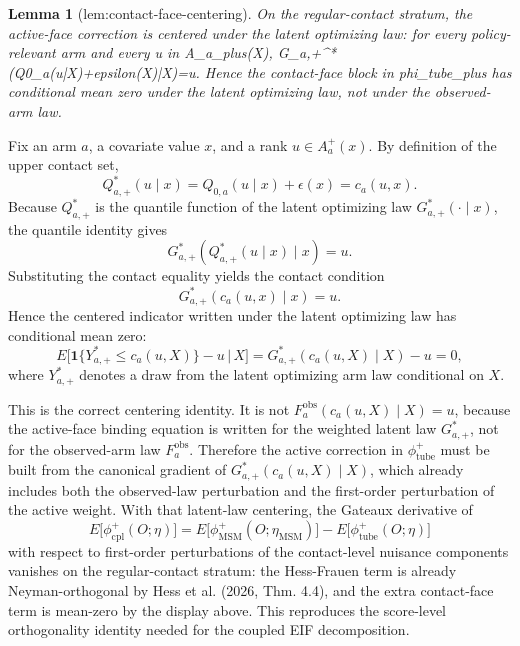 \documentclass{article}
\newtheorem{lemma}{Lemma}
\begin{document}
\begin{lemma}[lem:contact-face-centering]\label{lem:contact-face-centering}
On the regular-contact stratum, the active-face correction is centered under the latent optimizing law: for every policy-relevant arm and every u in A_a_plus(X), G_{a,+}^*(Q0_a(u|X)+epsilon(X)|X)=u. Hence the contact-face block in phi_tube_plus has conditional mean zero under the latent optimizing law, not under the observed-arm law.
\end{lemma}
Fix an arm \(a\), a covariate value \(x\), and a rank \(u\in A_a^+(x)\). By definition of the upper contact set,
\[
Q_{a,+}^*(u\mid x)=Q_{0,a}(u\mid x)+\epsilon(x)=c_a(u,x).
\]
Because \(Q_{a,+}^*\) is the quantile function of the latent optimizing law \(G_{a,+}^*(\cdot\mid x)\), the quantile identity gives
\[
G_{a,+}^*(Q_{a,+}^*(u\mid x)\mid x)=u.
\]
Substituting the contact equality yields the contact condition
\[
G_{a,+}^*(c_a(u,x)\mid x)=u.
\]
Hence the centered indicator written under the latent optimizing law has conditional mean zero:
\[
E\Big[\mathbf 1\{Y_{a,+}^*\le c_a(u,X)\}-u\,\Big|\,X\Big]
=G_{a,+}^*(c_a(u,X)\mid X)-u=0,
\]
where \(Y_{a,+}^*\) denotes a draw from the latent optimizing arm law conditional on \(X\).

This is the correct centering identity. It is not
\(
F_a^{\mathrm{obs}}(c_a(u,X)\mid X)=u
\),
because the active-face binding equation is written for the weighted latent law \(G_{a,+}^*\), not for the observed-arm law \(F_a^{\mathrm{obs}}\). Therefore the active correction in \(\phi_{\mathrm{tube}}^+\) must be built from the canonical gradient of \(G_{a,+}^*(c_a(u,X)\mid X)\), which already includes both the observed-law perturbation and the first-order perturbation of the active weight. With that latent-law centering, the Gateaux derivative of
\[
E\big[\phi_{\mathrm{cpl}}^+(O;\eta)\big]
=E\big[\phi_{\mathrm{MSM}}^+(O;\eta_{\mathrm{MSM}})\big]-E\big[\phi_{\mathrm{tube}}^+(O;\eta)\big]
\]
with respect to first-order perturbations of the contact-level nuisance components vanishes on the regular-contact stratum: the Hess-Frauen term is already Neyman-orthogonal by Hess et al. (2026, Thm. 4.4), and the extra contact-face term is mean-zero by the display above. This reproduces the score-level orthogonality identity needed for the coupled EIF decomposition.
\end{document}
